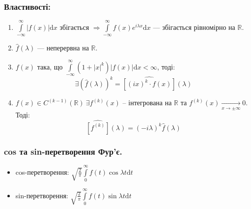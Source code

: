 \documentclass[a4paper]{scrartcl}
\theoremstyle{definition}
\theoremstyle{remark}
\theoremstyle{definition}
\theoremstyle{definition}
\def\i{\infty}                 %
\begin{document}
\subsubsection*{Властивості:}
\begin{enumerate}
  \item \( \displaystyle
  \int\limits_{-\i}^{\i}{
  \left| f(x) \right| \mathrm{d} x
  } \) збігається \(  \Longrightarrow \displaystyle \int\limits_{-\i}^{\i}{
  f(x) e^{i \lambda x} \mathrm{d} x }\) --- збігається рівномірно на \( \mathbb{R} \).
  \item \( \widehat{f} (\lambda ) \) --- неперервна на \( \mathbb{R} \).
  \item \( f(x) \) така, що \(  \int\limits_{-\i}^{\i}{
  (1 + |x|^k) \left| f(x) \right| \mathrm{d} x
  } < \i
   \), тоді:
   \[
\exists \left( \widehat{f}(\lambda) \right)^k = \widehat{\left[ (ix)^k \cdot f(x) \right]} (\lambda)
   \]
   \item \(  f(x) \in C^{(k-1)} (\mathbb{R})   \
   \exists f^{(k)} (x)
   \) -- інтегрована на \( \mathbb{R} \) та \(
   f^{(k)} (x) \xrightarrow[x\to \pm \i]{} 0
    \). Тоді:
    \[
      \widehat{\left[ f^{(k)} \right]} (\lambda) = (-i \lambda)^k \widehat{f} (\lambda)
    \]
\end{enumerate}
\subsubsection*{cos та sin-перетворення Фур'є.}
\begin{itemize}
  \item cos-перетворення: \( \displaystyle
  \sqrt{ \frac{2}{\pi}}  \int\limits_{0}^{\i}{f(t) \cos{\lambda t}} \mathrm{d} t \)
  \item sin-перетворення: \( \displaystyle
    \sqrt{ \frac{2}{\pi}}  \int\limits_{0}^{\i}{f(t) \sin{\lambda t}} \mathrm{d} t \)
\end{itemize}
\end{document}
